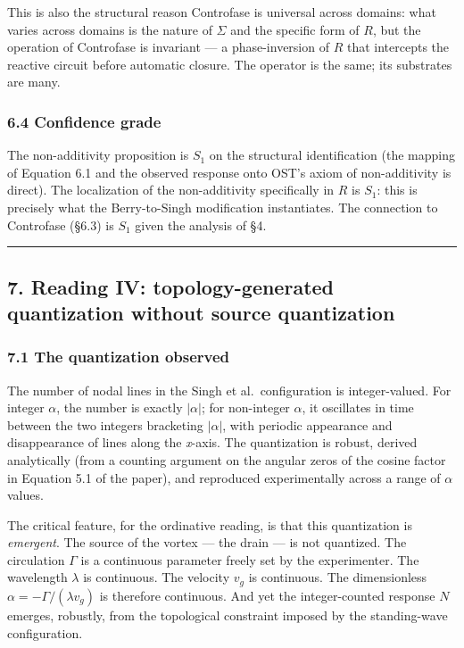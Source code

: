 \documentclass[
  11pt,
  a4paper,
]{article}
\begin{document}
This is also the structural reason Controfase is universal across
domains: what varies across domains is the nature of \(\Sigma\) and the
specific form of \(R\), but the operation of Controfase is invariant ---
a phase-inversion of \(R\) that intercepts the reactive circuit before
automatic closure. The operator is the same; its substrates are many.

\subsubsection{6.4 Confidence grade}\label{confidence-grade-2}

The non-additivity proposition is \(S_1\) on the structural
identification (the mapping of Equation 6.1 and the observed response
onto OST's axiom of non-additivity is direct). The localization of the
non-additivity specifically in \(R\) is \(S_1\): this is precisely what
the Berry-to-Singh modification instantiates. The connection to
Controfase (§6.3) is \(S_1\) given the analysis of §4.

\begin{center}\rule{0.5\linewidth}{0.5pt}\end{center}

\subsection{7. Reading IV: topology-generated quantization without
source
quantization}\label{reading-iv-topology-generated-quantization-without-source-quantization}

\subsubsection{7.1 The quantization
observed}\label{the-quantization-observed}

The number of nodal lines in the Singh et al.~configuration is
integer-valued. For integer \(\alpha\), the number is exactly
\(|\alpha|\); for non-integer \(\alpha\), it oscillates in time between
the two integers bracketing \(|\alpha|\), with periodic appearance and
disappearance of lines along the \emph{x}-axis. The quantization is
robust, derived analytically (from a counting argument on the angular
zeros of the cosine factor in Equation 5.1 of the paper), and reproduced
experimentally across a range of \(\alpha\) values.

The critical feature, for the ordinative reading, is that this
quantization is \emph{emergent}. The source of the vortex --- the drain
--- is not quantized. The circulation \(\Gamma\) is a continuous
parameter freely set by the experimenter. The wavelength \(\lambda\) is
continuous. The velocity \(v_g\) is continuous. The dimensionless
\(\alpha = -\Gamma/(\lambda v_g)\) is therefore continuous. And yet the
integer-counted response \(N\) emerges, robustly, from the topological
constraint imposed by the standing-wave configuration.
\end{document}
